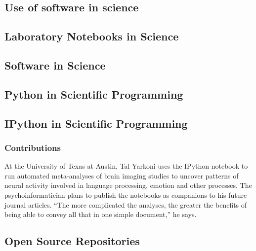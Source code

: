 
\subsection{Use of software in science}


\subsection{Laboratory Notebooks in Science}
%

\subsection{Software in Science}

\subsection{Python in Scientific Programming}




%

\subsection{IPython in Scientific Programming}



\subsubsection{Contributions}


At the University of Texas at Austin, Tal Yarkoni
uses the IPython notebook to run automated
meta-analyses of brain imaging studies to
uncover patterns of neural activity involved in
language processing, emotion and other processes.
The psychoinformatician plans to publish
the notebooks as companions to his future
journal articles. “The more complicated the
analyses, the greater the benefits of being able to convey all that in one simple document,” he says.
\cite{shen2014interactive}

\subsection{Open Source Repositories}


